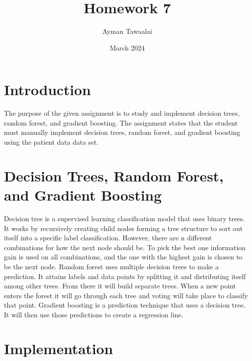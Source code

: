 \documentclass{article}
\title{Homework 7}
\author{Ayman Tawaalai}
\date{March 2024}
\begin{document}
\maketitle

\section{Introduction}
The purpose of the given assignment is to study and implement decision trees, random forest, and gradient boosting. The assignment states that the student must manually implement decision trees, random forest, and gradient boosting using the patient data data set.

\section{Decision Trees, Random Forest, and Gradient Boosting}
Decision tree is a supervised learning classification model that uses binary trees. It works by recursively creating child nodes forming a tree structure to sort out itself into a specific label classification. However, there are n different combinations for how the next node should be. To pick the best one information gain is used on all combinations, and the one with the highest gain is chosen to be the next node. Random forest uses multiple decision trees to make a prediction. It attains labels and data points by splitting it and distributing itself among other trees. From there it will build separate trees. When a new point enters the forest it will go through each tree and voting will take place to classify that point. Gradient boosting is a prediction technique that uses a decision tree. It will then use those predictions to create a regression line. 

\section{Implementation}
\end{document}
